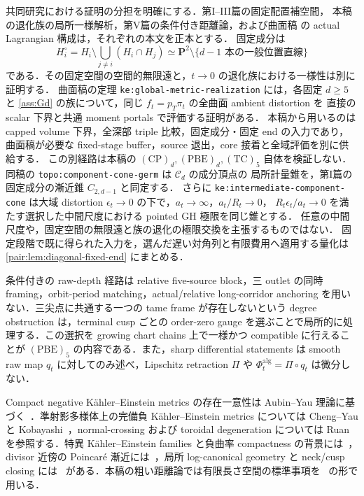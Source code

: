 \documentclass[a4paper,11pt]{ltjsarticle}
\numberwithin{equation}{section}
\theoremstyle{plain}
\theoremstyle{definition}
\theoremstyle{remark}
\newcommand{\PP}{\mathbf P}\newcommand{\CC}{\mathbf C}\newcommand{\RR}{\mathbf R}\newcommand{\ZZ}{\mathbf Z}\newcommand{\NN}{\mathbf N}
\begin{document}
共同研究における証明の分担を明確にする．第I--III篇の固定配置補空間，
本稿の退化族の局所一様解析，第V篇の条件付き距離論，および曲面稿
\cite{LagrangianCurrent}の actual Lagrangian 構成は，それぞれの本文を正本とする．
固定成分は
\[
 H_i^\circ=H_i\setminus\bigcup_{j\ne i}(H_i\cap H_j)
 \simeq\PP^2\setminus\{d-1\text{ 本の一般位置直線}\}
\]
である．その固定空間の空間的無限遠と，$t\to0$ の退化族における一様性は別に証明する．
曲面稿の定理 \texttt{ke:global-metric-realization} には，各固定 $d\ge5$ と
\cref{ass:Gd} の族について，同じ $f_t=p_T\pi_t$ の全曲面 ambient distortion を
直接の scalar 下界と共通 moment portals で評価する証明がある．
本稿から用いるのは capped volume 下界，全深部 triple 比較，固定成分・固定 end の入力であり，
曲面稿が必要な fixed-stage buffer，source 退出，core 接着と全域評価を別に供給する．
この別経路は本稿の $\mathrm{(CP)}_d,\mathrm{(PBE)}_d,\mathrm{(TC)}_5$ 自体を検証しない．
同稿の \texttt{topo:component-cone-germ} は $\mathcal C_d$ の成分頂点の
局所計量錐を，第I篇の固定成分の漸近錐 $C_{2,d-1}$ と同定する．
さらに \texttt{ke:intermediate-component-cone} は大域 distortion
$\epsilon_t\to0$ の下で，$a_t\to\infty$，$a_t/R_t\to0$，
$R_t\epsilon_t/a_t\to0$ を満たす選択した中間尺度における pointed GH 極限を同じ錐とする．
任意の中間尺度や，固定空間の無限遠と族の退化の極限交換を主張するものではない．
固定段階で既に得られた入力を，選んだ遅い対角列と有限費用へ適用する量化は
\cref{pair:lem:diagonal-fixed-end} にまとめる．

条件付きの raw-depth 経路は relative five-source block，三 outlet の同時 framing，orbit-period matching，actual/relative long-corridor anchoring を用いない．三尖点に共通する一つの tame frame が存在しないという degree obstruction は，terminal cusp ごとの order-zero gauge を選ぶことで局所的に処理する．この選択を growing chart chains 上で一様かつ compatible に行えることが $\mathrm{(PBE)}_5$ の内容である．また，sharp differential statements は smooth raw map $q_t$ に対してのみ述べ，Lipschitz retraction $\Pi$ や $\Phi_t^{\mathrm{alg}}=\Pi\circ q_t$ は微分しない．

Compact negative Kähler--Einstein metrics の存在一意性は Aubin--Yau 理論に基づく~\cite{Aubin,Yau}．準射影多様体上の完備負 Kähler--Einstein metrics については Cheng--Yau と Kobayashi~\cite{ChengYau,Kobayashi}，normal-crossing および toroidal degeneration については Ruan~\cite{RuanI,RuanII} を参照する．特異 Kähler--Einstein families と負曲率 compactness の背景には~\cite{DGG,SongSturmWang}，divisor 近傍の Poincaré 漸近には~\cite{Guenancia,RochonZhang}，局所 log-canonical geometry と neck/cusp closing には~\cite{DatarFuSong,Mandel,FuHeinJiang} がある．本稿の粗い距離論では有限長さ空間の標準事項を~\cite{BBI} の形で用いる．
\end{document}
